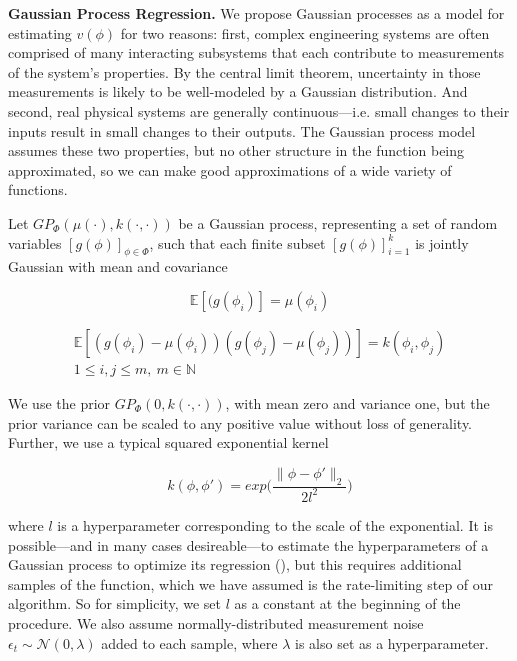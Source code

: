 \documentclass[letterpaper, 10 pt, conference]{ieeeconf}  %
\begin{document}
\noindent\textbf{Gaussian Process Regression.} We propose Gaussian processes as a model for estimating $v(\phi)$ for two reasons: first, complex engineering systems are often comprised of many interacting subsystems that each contribute to measurements of the system's properties. By the central limit theorem, uncertainty in those measurements is likely to be well-modeled by a Gaussian distribution. And second, real physical systems are generally continuous---i.e. small changes to their inputs result in small changes to their outputs. The Gaussian process model assumes these two properties, but no other structure in the function being approximated, so we can make good approximations of a wide variety of functions.

Let $GP_\Phi(\mu(\cdot),k(\cdot,\cdot))$ be a Gaussian process, representing a set of random variables $[g(\phi)]_{\phi\in\Phi}$, such that each finite subset $[g(\phi)]_{i=1}^k$ is jointly Gaussian with mean and covariance

\begin{equation}
    \mathbb{E}[(g(\phi_i)] = \mu(\phi_i)
    \label{eq:jointmean}
\end{equation}

\begin{multline}
    \mathbb{E}[(g(\phi_i)-\mu(\phi_i))(g(\phi_j)-\mu(\phi_j))]=k(\phi_i,\phi_j) \\
    1\leq i,j\leq m,\ m\in \mathbb{N}
    \label{eq:jointcov}
\end{multline}
\smallskip

We use the prior $GP_\Phi(0,k(\cdot,\cdot))$, with mean zero and variance one, but the prior variance can be scaled to any positive value without loss of generality. Further, we use a typical squared exponential kernel

\begin{equation}
    k(\phi,\phi') = exp\bigg(\frac{\|\phi-\phi'\|_2}{2l^2}\bigg)
\end{equation}

where $l$ is a hyperparameter corresponding to the scale of the exponential. It is possible---and in many cases desireable---to estimate the hyperparameters of a Gaussian process to optimize its regression (\cite{blum13,chen16}), but this requires additional samples of the function, which we have assumed is the rate-limiting step of our algorithm. So for simplicity, we set $l$ as a constant at the beginning of the procedure. We also assume normally-distributed measurement noise $\epsilon_t\sim\mathcal{N}(0,\lambda)$ added to each sample, where $\lambda$ is also set as a hyperparameter.
\end{document}
